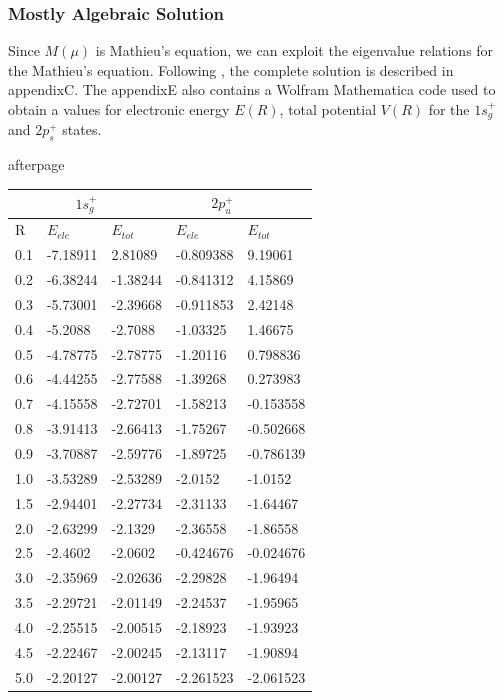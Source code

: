 \subsubsection{Mostly Algebraic Solution}

Since $ M(\mu) $ is Mathieu's equation, we can exploit the eigenvalue relations for the Mathieu's equation. Following \cite{H2Plus2d2}, the complete solution is described in appendixC. The appendixE also contains a Wolfram Mathematica code used to obtain a values for electronic energy $ E(R) $, total potential $ V(R) $ for the  $ 1s_g^{+} $ and $2p_{s}^{+} $ states. 

afterpage{
  \captionsetup{type=figure}
  \label{tab:H2Plus2D}
  \begin{tabular}{ |l|l|l|l|l| }
      \hline
      \multicolumn{1}{r}{} &
      \multicolumn{1}{r}{ $ 1s_g^+ $} &
      \multicolumn{1}{r}{} &
      \multicolumn{1}{r}{$ 2p_u^+ $ } \\
      \hline
      R & $ E_{ele} $ & $ E_{tot} $ & $ E_{ele} $ & $ E_{tot} $  \\ 
      0.1 & -7.18911 & 2.81089 & -0.809388 & 9.19061 \\
      0.2 & -6.38244 & -1.38244 & -0.841312 & 4.15869\\
      0.3 & -5.73001 & -2.39668 & -0.911853 & 2.42148 \\
      0.4 & -5.2088 & -2.7088 & -1.03325 &  1.46675\\
      0.5 & -4.78775 & -2.78775 & -1.20116 & 0.798836 \\
      0.6 & -4.44255 & -2.77588 & -1.39268 & 0.273983\\
      0.7 & -4.15558 & -2.72701 & -1.58213 & -0.153558 \\
      0.8 & -3.91413 & -2.66413 & -1.75267 & -0.502668 \\
      0.9 & -3.70887 & -2.59776 & -1.89725 & -0.786139\\
      1.0 & -3.53289 & -2.53289 & -2.0152 & -1.0152 \\
      1.5 & -2.94401 & -2.27734 & -2.31133 & -1.64467\\
      2.0 & -2.63299 & -2.1329 & -2.36558 & -1.86558 \\
      2.5 & -2.4602 & -2.0602 & -0.424676 & -0.024676\\
      3.0 & -2.35969 & -2.02636 & -2.29828 & -1.96494 \\
      3.5 & -2.29721 & -2.01149 & -2.24537 & -1.95965 \\
      4.0 & -2.25515 & -2.00515 & -2.18923 & -1.93923 \\
      4.5 & -2.22467 & -2.00245 & -2.13117 & -1.90894 \\
      5.0 & -2.20127 & -2.00127 & -2.261523 & -2.061523 \\
      \hline 
  \end{tabular}
}

